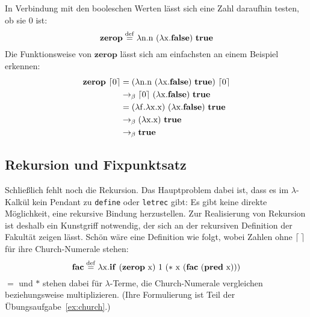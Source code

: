 In Verbindung mit den booleschen Werten lässt sich eine Zahl daraufhin
testen, ob sie $0$ ist:
%
\begin{displaymath}
  \mathbf{zerop} \stackrel{\rm def}{=}{} \lambda \mathrm n.\mathrm n~(\lambda \mathrm x.\mathbf{false})~\mathbf{true}
\end{displaymath}
%
Die Funktionsweise von $\mathbf{zerop}$ lässt sich am einfachsten an
einem Beispiel erkennen:
%
\begin{displaymath}
  \begin{split}
    \mathbf{zerop}~\lceil 0\rceil & =
    (\lambda \mathrm n.\mathrm n~(\lambda \mathrm x.\mathbf{false})~\mathbf{true})~\lceil 0\rceil\\
    & \rightarrow_\beta \lceil 0\rceil~(\lambda \mathrm x.\mathbf{false})~\mathbf{true}\\
    & = (\lambda \mathrm f.\lambda \mathrm x.\mathrm x)~(\lambda \mathrm x.\mathbf{false})~\mathbf{true}\\
    & \rightarrow_\beta (\lambda \mathrm x.\mathrm x)~\mathbf{true}\\
    & \rightarrow_\beta \mathbf{true}
  \end{split}
\end{displaymath}
%

\subsection{Rekursion und Fixpunktsatz}
\label{sec:fixpunktsatz}
%
Schließlich fehlt noch die Rekursion.  Das Hauptproblem dabei ist, dass
es im $\lambda$-Kalkül kein Pendant zu \texttt{define} oder
\texttt{letrec} gibt: Es gibt keine direkte Möglichkeit, eine
rekursive Bindung herzustellen.  Zur Realisierung von Rekursion ist
deshalb ein Kunstgriff notwendig, der sich an der rekursiven
Definition der Fakultät zeigen lässt.
Schön wäre eine Definition wie folgt, wobei Zahlen ohne $\lceil\:\rceil$ für
ihre Church-Numerale stehen:
%
\begin{displaymath}
  \mathbf{fac} \stackrel{\rm def}{=}{} \lambda \mathrm x.\mathbf{if}~(\mathbf{zerop}~\mathrm x)~1~(\ast~\mathrm x~(\mathbf{fac}~(\mathbf{pred}~\mathrm x)))
\end{displaymath}
%
$=$ und $\ast$ stehen dabei für $\lambda$-Terme, die Church-Numerale
vergleichen beziehungsweise multiplizieren.  (Ihre Formulierung ist Teil der
Übungsaufgabe~\ref{ex:church}.)

